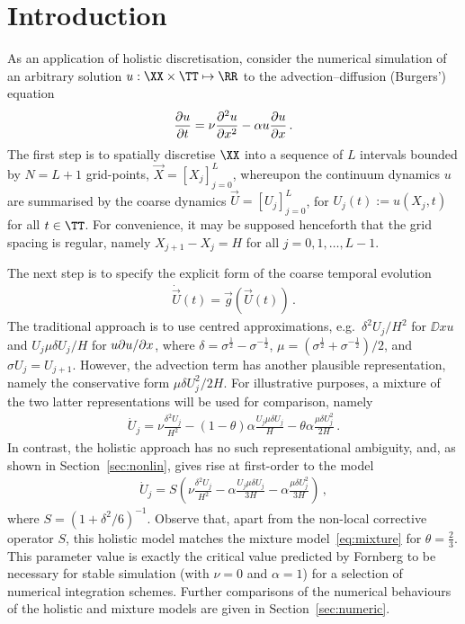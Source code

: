 \documentclass[12pt,a4paper]{article}
\newcommand{\secref}[1]{\ref{sec:#1}}
\begin{document}
\section{Introduction}\label{sec:intro}
As an application of holistic discretisation, consider the numerical simulation of
an arbitrary solution $u:\XX\times \TT\mapsto \RR$ to the advection--diffusion (Burgers') equation
\begin{eqnarray}
	\D tu = \nu\DD xu - \alpha u\D xu\,.
\label{eq:burgers}
\end{eqnarray}
The first step is to spatially discretise $\XX$ into a sequence of $L$ intervals bounded by $N=L+1$  grid-points,
 ${\vec X}=[X_j]_{j=0}^{L}$, 
whereupon the continuum dynamics $u$ are summarised by the coarse dynamics
${\vec U}=[U_j]_{j=0}^{L}$, for $U_j(t):=u(X_j,t)$ for all $t\in \TT$.
For convenience, it may be supposed henceforth that the grid spacing is regular,
namely $X_{j+1}-X_j=H$ for all $j=0,1,\ldots,L-1$.

The next step is to specify the explicit form of the coarse temporal evolution
\begin{eqnarray}
	\dot{\vec U}(t) = {\vec g}({\vec U}(t))\,.
\label{eq:temporal}
\end{eqnarray}
The traditional approach is to use centred approximations, e.g.\ $\delta^2 U_j/H^2$ for $\DD xu$
and $U_j\mu\delta U_j/H$ for $u\D xu$, 
where $\delta=\sigma^{\frac{1}{2}}-\sigma^{-\frac{1}{2}}$,
$\mu=(\sigma^{\frac{1}{2}}+\sigma^{-\frac{1}{2}})/2$,
and $\sigma U_j=U_{j+1}$.
However, the advection term has another plausible representation, namely the
conservative form $\mu\delta U_j^2/2H$.
For illustrative purposes, a mixture of the two latter representations will be used for comparison,
namely
\begin{eqnarray}
	\dot{U}_j = \nu\frac{\delta^2 U_j}{H^2}-(1-\theta)\alpha\frac{U_j\mu\delta U_j}{H}
-\theta\alpha\frac{\mu\delta U_j^2}{2H}\,.
\label{eq:mixture}
\end{eqnarray}
In contrast, the holistic approach has no such representational ambiguity, and, 
as shown in Section~\secref{nonlin}, gives rise at first-order to the model
\begin{eqnarray}
	\dot{U}_j = S\left(\nu\frac{\delta^2 U_j}{H^2}-\alpha\frac{U_j\mu\delta U_j}{3H}
-\alpha\frac{\mu\delta U_j^2}{3H}\right)\,,
\label{eq:holistic1}
\end{eqnarray}
where $S=(1+\delta^2/6)^{-1}$. Observe that, apart from the non-local corrective operator $S$,
this holistic model matches the mixture model~\eqref{eq:mixture} for $\theta=\frac{2}{3}$.
This parameter value is exactly the critical value predicted by Fornberg \cite{} 
to be necessary for stable simulation (with $\nu=0$ and $\alpha=1$) for a selection of numerical integration schemes.
Further comparisons of the numerical behaviours of the holistic and mixture models are given in Section~\secref{numeric}.
\end{document}
